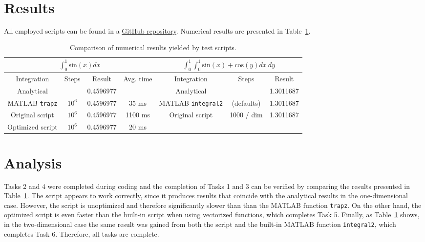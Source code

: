 \documentclass{article}
\begin{document}
	\section*{Results}
	All employed scripts can be found in a \href{https://github.com/VesaVilleHurskainen/cmim2018}{GitHub repository}. Numerical results are presented in Table~\ref{tab:results}.
	 \begin{table}[ht]
	 	\def\arraystretch{1.3}
		\begin{center}
			\begin{tabular}{|c|c|c|c||c|c|c|}
				\hline
				\multicolumn{4}{|c||}{$\int_{0}^{1} \textrm{sin}(x) dx$} & \multicolumn{3}{c|}{$\int_{0}^{1} \int_{0}^{1} \textrm{sin}(x) + \textrm{cos}(y) dx~dy$}\\
				\hline
				Integration                    & Steps  & Result    & Avg. time & Integration                        & Steps  & Result \\
				\hline
				Analytical                     &        & 0.4596977 &           & Analytical                &                    & 1.3011687 \\
				MATLAB \texttt{trapz} & $10^6$ & 0.4596977 & 35 ms               & MATLAB \texttt{integral2} & (defaults) & 1.3011687 \\
				Original script                & $10^6$ & 0.4596977 & 1100 ms   & Original script           & 1000 / dim & 1.3011687 \\
				Optimized script               & $10^6$ & 0.4596977 & 20 ms &&&\\
				\hline
			\end{tabular}
			\caption{Comparison of numerical results yielded by test scripts.}
			\label{tab:results}
		\end{center}
	\end{table}
	\vspace{-1cm}

	\section*{Analysis}
	Tasks 2 and 4 were completed during coding and the completion of Tasks 1 and 3 can be verified by comparing the results presented in Table~\ref{tab:results}. The script appears to work correctly, since it produces results that coincide with the analytical results in the one-dimensional case. However, the script is unoptimized and therefore significantly slower than than the MATLAB function \texttt{trapz}. On the other hand, the optimized script is even faster than the built-in script when using vectorized functions, which completes Task 5. Finally, as Table~\ref{tab:results} shows, in the two-dimensional case the same result was gained from both the script and the built-in MATLAB function \texttt{integral2}, which completes Task 6. Therefore, all tasks are complete.\\
\end{document}
